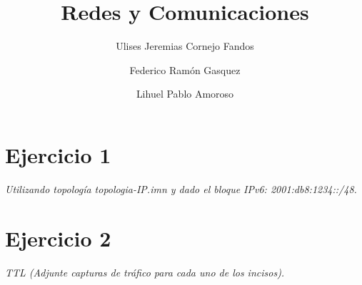 \documentclass[osajnl,twocolumn,showpacs,superscriptaddress,10pt]{revtex4-1} %
\begin{document}
\title{Redes y Comunicaciones}

\author{Ulises Jeremias Cornejo Fandos}

\author{Federico Ramón Gasquez}

\author{Lihuel Pablo Amoroso}


\maketitle %

\onecolumngrid

\section{Ejercicio 1}

\textit{Utilizando topología topologia-IP.imn y dado el bloque IPv6: 2001:db8:1234::/48.}

\section{Ejercicio 2}

\textit{TTL (Adjunte capturas de tráfico para cada uno de los incisos).}
\end{document}
